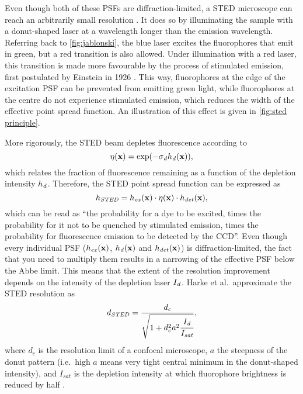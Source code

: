 Even though both of these PSFs are diffraction-limited, a STED microscope can reach an arbitrarily small resolution \cite{Wildanger2012}. It does so by illuminating the sample with a donut-shaped laser at a wavelength longer than the emission wavelength. Referring back to \autoref{fig:jablonski}, the blue laser excites the fluorophores that emit in green, but a red transition is also allowed. Under illumination with a red laser, this transition is made more favourable by the process of stimulated emission, first postulated by Einstein in 1926 \cite{Einstein1926}. This way, fluorophores at the edge of the excitation PSF can be prevented from emitting green light, while fluorophores at the centre do not experience stimulated emission, which reduces the width of the effective point spread function. An illustration of this effect is given in \autoref{fig:sted principle}.


More rigorously, the STED beam depletes fluorescence according to
\begin{equation}
	\eta(\vb{x}) = \exp(-\sigma_{\mathit{d}} h_{\mathit{d}}(\vb{x})),
\end{equation}
which relates the fraction of fluorescence remaining as a function of the depletion intensity $ h_{\mathit{d}} $. Therefore, the STED point spread function can be expressed as
\begin{equation}
	h_\mathit{STED} = h_{\mathit{ex}}(\vb{x}) \cdot \eta(\vb{x}) \cdot h_\mathit{det}(\vb{x}),
\end{equation}
which can be read as ``the probability for a dye to be excited, times the probability for it not to be quenched by stimulated emission, times the probability for fluorescence emission to be detected by the CCD''. Even though every individual PSF ($ h_{\mathit{ex}}(\vb{x}) $, $ h_{\mathit{d}}(\vb{x}) $ and $ h_\mathit{det}(\vb{x}) $) is diffraction-limited, the fact that you need to multiply them results in a narrowing of the effective PSF below the Abbe limit. This means that the extent of the resolution improvement depends on the intensity of the depletion laser $ I_{\mathit{d}}$. Harke et al.~approximate the STED resolution as
\begin{equation}
	d_\mathit{STED} = \frac{d_c}{\sqrt{1+d_c^2a^2\cfrac{I_{\mathit{d}}}{I_\mathit{sat}}}},
\end{equation}
where $ d_c $ is the resolution limit of a confocal microscope, $ a $ the steepness of the donut pattern (i.e.~high $ a $ means very tight central minimum in the donut-shaped intensity), and $ I_\mathit{sat} $ is the depletion intensity at which fluorophore brightness is reduced by half \cite{Harke2008}.

